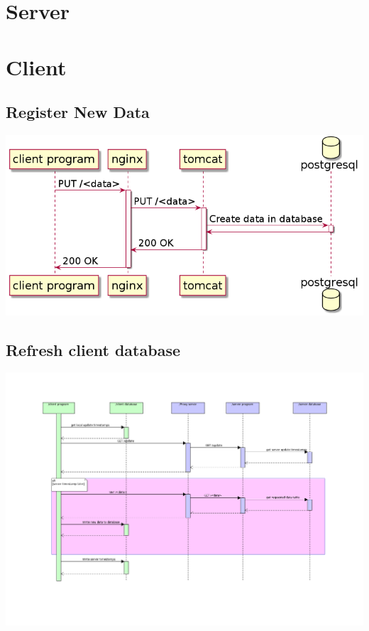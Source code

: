 \documentclass[12pt]{report}
\begin{document}
\section{Server}

\section{Client}

\subsection{Register New Data}

\includegraphics[width=\linewidth]{diagrams/put-data.png}

\subsection{Refresh client database}

\includegraphics[width=\linewidth]{diagrams/Refreshment.png}
\end{document}
